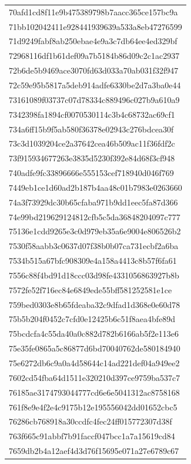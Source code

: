 \begin{tabular}{l}
70afd1cd8f11e9b475389798b7aacc365ce157bc9a \\
71bb102042411e928441939639a533a8eb47276599 \\
71d9249fabf8ab250ebae4e9a3c7db64ee4ed329bf \\
72968116df1b61def09a7b5184b86d09c2c1ac2937 \\
72b6de5b9469ace3070fd63d033a70ab031f32f947 \\
72c59e95b5817a5deb914adfe6330be2d7a3ba0e44 \\
73161089f03737c07d78334c889496c027b9a610a9 \\
7342398fa1894cf0070530114c3b4c68732ac69cf1 \\
734a6ff15b9f5ab580f36378e02943c276bdcea30f \\
73c3d1039204ce2a37642cea46b509ac11f36fdf2c \\
73f915934677263e3835d5230f392e84d68f3cf948 \\
740adfe9fc33896666e555153cef718940d046f769 \\
7449eb1ce1d60ad2b187b4aa48c01b7983e0263660 \\
74a3f73929dc30b65cfaba971b9dd1eec5fa87d366 \\
74e99bd219629124812cfb5c5da36848204097c777 \\
75136e1cdd9265e3c0d979eb35a6e9004e806526b2 \\
7530f58aabb3c0637d07f38b0b07ca731ecbf2a6ba \\
7534b515a67bfc908309e4a158a4413c8b57f6fa61 \\
7556c88f4bd91d18ccc03d98fe4331056863927b8b \\
7572fe52f716ec84e6849ede55bff581252581e1ce \\
759bed0303e8b65fdeaba32c9dfad1d368e0e60d78 \\
75b5b204f0452c7cfd0e12425b6c51f8aea4bfe89d \\
75bcdcfa4c55da40a0c882d782b6166ab5f2e113e6 \\
75e35fe0865a5c86877d6bd70040762de580184940 \\
75e6272db6c9a0a4d58644c14ad221def04a949ee2 \\
7602cd54fba64d1511e320210d397ce9759ba537c7 \\
76185ae3174793044777cd6e6e5041312ac8758168 \\
761f8e9e4f2e4c9175b12e195556042dd01652cbc5 \\
76286cb768918a30ccdfc4fec24ff015772307d38f \\
763f665c91abbf7b91faccf047bcc1a7a15619cd84 \\
7659db2b4a12aef4d3d76f15695e071a27e6789c67 \\

\end{tabular}
